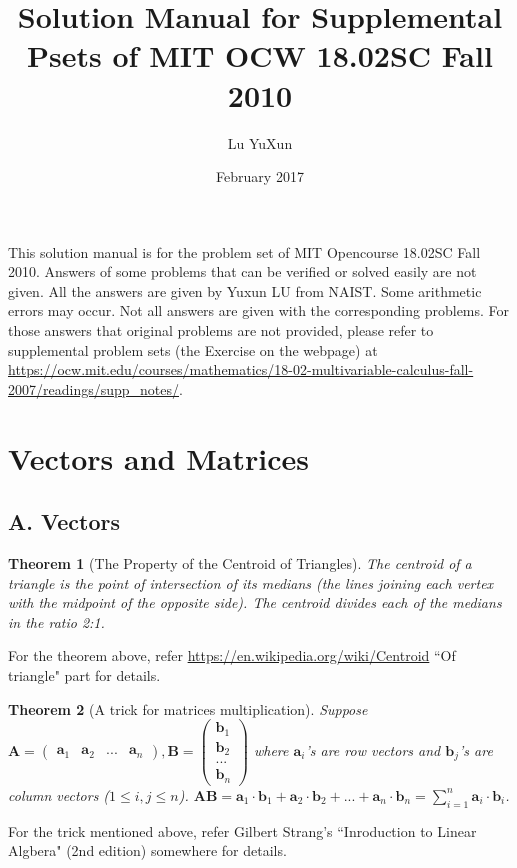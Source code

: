 \documentclass{article}
\title{Solution Manual for Supplemental Psets of MIT OCW 18.02SC Fall 2010}
\author{Lu YuXun}
\date{February 2017}
\newtheorem{theorem}{Theorem}
\begin{document}
\maketitle
This solution manual is for the problem set of MIT Opencourse 18.02SC Fall 2010. Answers of some problems that can be verified or solved easily are not given. All the answers are given by Yuxun LU from NAIST. Some arithmetic errors may occur. Not all answers are given with the corresponding problems. For those answers that original problems are not provided, please refer to supplemental problem sets (the Exercise on the webpage) at \url{https://ocw.mit.edu/courses/mathematics/18-02-multivariable-calculus-fall-2007/readings/supp_notes/}.
\section{Vectors and Matrices}
\subsection{A. Vectors}
\begin{theorem}[The Property of the Centroid of Triangles]
The centroid of a triangle is the point of intersection of its medians (the lines joining each vertex with the midpoint of the opposite side). The centroid divides each of the medians in the ratio 2:1. 
\end{theorem}
For the theorem above, refer \url{https://en.wikipedia.org/wiki/Centroid} ``Of triangle" part for details.

\begin{theorem}[A trick for matrices multiplication]
Suppose $\mathbf{A} = \begin{pmatrix}
\mathbf{a}_1 & \mathbf{a}_2 & ... & \mathbf{a}_n
\end{pmatrix}, \mathbf{B} = \begin{pmatrix}
\mathbf{b}_1 \\
\mathbf{b}_2 \\
... \\
\mathbf{b}_n
\end{pmatrix}$ where $\mathbf{a}_i$'s are row vectors and $\mathbf{b}_j$'s are column vectors ($1 \leq i,j \leq n$). $\mathbf{AB} = \mathbf{a}_1 \cdot \mathbf{b}_1 + \mathbf{a}_2 \cdot \mathbf{b}_2 + ... + \mathbf{a}_n \cdot \mathbf{b}_n = \sum_{i=1}^n \mathbf{a}_i \cdot \mathbf{b}_i$.
\end{theorem}
For the trick mentioned above, refer Gilbert Strang's ``Inroduction to Linear Algbera" (2nd edition) somewhere for details.
\end{document}
